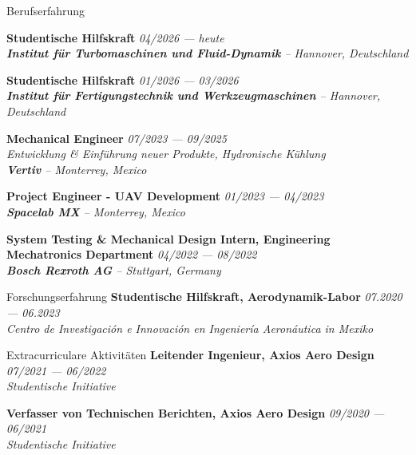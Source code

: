 \documentclass[a4paper]{resume} %
\begin{document}
\begin{rSection}{Berufserfahrung}
	
		{\bf Studentische Hilfskraft} \hfill{\itshape 04/2026 --- heute} 
		\\{\textit{\textbf{Institut für Turbomaschinen und Fluid-Dynamik} -- Hannover, Deutschland}}

	
      	{\bf Studentische Hilfskraft} \hfill{\itshape 01/2026 --- 03/2026} 
		\\{\textit{\textbf{Institut für Fertigungstechnik und Werkzeugmaschinen } -- Hannover, Deutschland}}

	
        {\bf Mechanical Engineer} \hfill{\itshape 07/2023 --- 09/2025} 
        \\{\textit{Entwicklung \& Einführung neuer Produkte, Hydronische Kühlung}}
        \\{\textit{\textbf{Vertiv} -- Monterrey, Mexico}}

        
        {\bf Project Engineer - UAV Development} \hfill{\itshape 01/2023 --- 04/2023} 
        \\{\textit{\textbf{Spacelab MX} -- Monterrey, Mexico}}

    
        {\bf System Testing \& Mechanical Design Intern, Engineering Mechatronics Department} \hfill{\itshape 04/2022 --- 08/2022} 
        \\{\textit{\textbf{Bosch Rexroth AG} -- Stuttgart, Germany}}

    \end{rSection}

    
    \begin{rSection}{Forschungserfahrung}
        {\bf Studentische Hilfskraft, Aerodynamik-Labor} \hfill {\itshape 07.2020 --- 06.2023} 
        \\{\textit{Centro de Investigación e Innovación en Ingeniería Aeronáutica in Mexiko}}
    \end{rSection}
    

    
    \begin{rSection}{Extracurriculare Aktivitäten}
        {\bf Leitender Ingenieur, Axios Aero Design} \hfill {\itshape 07/2021 --- 06/2022} 
        \\{\textit{Studentische Initiative}}
        

        {\bf Verfasser von Technischen Berichten, Axios Aero Design} \hfill {\itshape 09/2020 --- 06/2021} 
        \\{\textit{Studentische Initiative}}\\\\
        
    \end{rSection}
    
\end{document}
